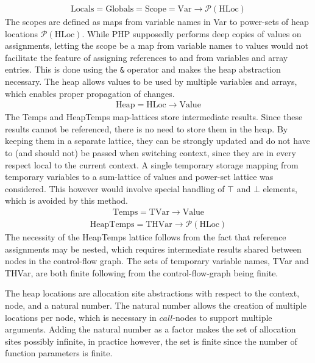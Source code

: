 \begin{align}
\text{Locals} = \text{Globals} = \text{Scope} = \text{Var} \rightarrow \mathcal{P}(\text{HLoc})
\end{align}
The scopes are defined as maps from variable names in Var to power-sets of heap locations $\mathcal{P}(\text{HLoc})$. While PHP supposedly performs deep copies of values on assignments, letting the scope be a map from variable names to values would not facilitate the feature of assigning references to and from variables and array entries. This is done using the \texttt{\&} operator and makes the heap abstraction necessary. The heap allows values to be used by multiple variables and arrays, which enables proper propagation of changes. 
\begin{align}
\text{Heap} = \text{HLoc} \rightarrow \text{Value}
\end{align}
The Temps and HeapTemps map-lattices store intermediate results. Since these results cannot be referenced, there is no need to store them in the heap. By keeping them in a separate lattice, they can be strongly updated and do not have to (and should not) be passed when switching context, since they are in every respect local to the current context. A single temporary storage mapping from temporary variables to a sum-lattice of values and power-set lattice was considered. This however would involve special handling of $\top$ and $\bot$ elements, which is avoided by this method. 
\begin{align}
\text{Temps} = \text{TVar} \rightarrow \text{Value}
\end{align}
\begin{align}
\text{HeapTemps} = \text{THVar} \rightarrow \mathcal{P}(\text{HLoc})
\end{align}
The necessity of the HeapTemps lattice follows from the fact that reference assignments may be nested, which requires intermediate results shared between nodes in the control-flow graph. The sets of temporary variable names, TVar and THVar, are both finite following from the control-flow-graph being finite.

The heap locations are allocation site abstractions with respect to the context, node, and a natural number. The natural number allows the creation of multiple locations per node, which is necessary in $\mathit{call}$-nodes to support multiple arguments. Adding the natural number as a factor makes the set of allocation sites possibly infinite, in practice however, the set is finite since the number of function parameters is finite.

